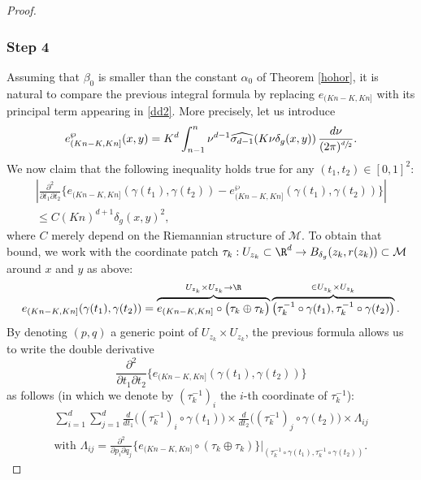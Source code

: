 \begin{proof}
\subsubsection*{Step 4} Assuming that $\beta_0$ is smaller than the constant $\alpha_0$ of Theorem \ref{hohor}, it is natural to compare the previous integral formula by replacing $e_{(Kn-K,Kn]}$ with its principal term appearing in \eqref{dd2}.
More precisely, let us introduce
\begin{equation}\label{dd3}
e_{(Kn-K,Kn]}^{\wp}(x,y)=K^{d} \int_{n-1}^{n}\nu^{d-1}\widehat{\sigma_{d-1}}(K \nu \delta_g(x,y))\,
\frac{d\nu}{(2\pi)^{\sfrac{d}{2}}}.
\end{equation}
We now claim that the following inequality holds true for any $(t_1,t_2)\in [0,1]^2$:
\begin{multline}\label{remem}
\left\vert \frac{\partial^2}{\partial t_1 \partial t_2} \Big\{ e_{(Kn-K,Kn]}(\gamma(t_1),\gamma(t_2))- e_{(Kn-K,Kn]}^{\wp}(\gamma(t_1),\gamma(t_2)) \Big\} \right\vert\\
\leq C(Kn)^{d+1} \delta_g(x,y)^2,
\end{multline}
where $C$ merely depend on the Riemannian structure of $\mathcal{M}$.
To obtain that bound, we work with the coordinate patch $\tau_{k}:U_{z_k}\subset \R^d\to B_{\delta_g}(z_k,r(z_k))\subset \mathcal{M}$ around $x$ and $y$ as above:
\begin{equation*}
e_{(Kn-K,Kn]}(\gamma(t_1),\gamma(t_2)) = \overbrace{e_{(Kn-K,Kn]}\circ \bigl(\tau_k\oplus \tau_k \bigr)}^{U_{z_k}\times U_{z_k}\to \R} \overbrace{\bigl(\tau_k^{-1}\circ \gamma(t_1),\tau_k^{-1} \circ \gamma(t_2)\bigr)}^{\in U_{z_k}\times U_{z_k}}.
\end{equation*}
By denoting $(p,q)$ a generic point of $U_{z_k}\times U_{z_k}$, the previous formula allows us to write the double derivative
\begin{equation*}
\frac{\partial^2 }{\partial t_1 \partial t_2}\Big\{ e_{(Kn-K,Kn]}(\gamma(t_1),\gamma(t_2))\Big\}
\end{equation*} as follows (in which we denote by $(\tau_k^{-1})_i$ the $i$-th coordinate of $\tau_k^{-1}$):
\begin{multline*}
\sum_{i=1}^{d} \sum_{j=1}^{d}
\frac{d}{dt_1} \bigl((\tau_k^{-1})_i \circ \gamma(t_1) \bigr)\times
\frac{d}{dt_2} \bigl((\tau_k^{-1})_j \circ \gamma(t_2) \bigr) \times \Lambda_{ij}\\
\text{with }\Lambda_{ij}=\frac{\partial^2 }{\partial p_i \partial q_j} \{ e_{(Kn-K,Kn]}\circ (\tau_k\oplus \tau_k)\}\Big\vert_{(\tau_k^{-1}\circ \gamma(t_1),\tau_k^{-1} \circ \gamma(t_2))}.

\end{multline*}
\end{proof}
